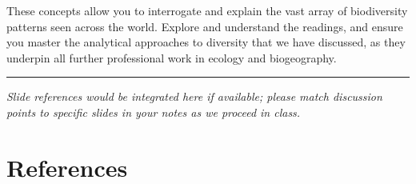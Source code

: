 \documentclass[
  12pt,
]{book}
\begin{document}
These concepts allow you to interrogate and explain the vast array of
biodiversity patterns seen across the world. Explore and understand the
readings, and ensure you master the analytical approaches to diversity
that we have discussed, as they underpin all further professional work
in ecology and biogeography.

\begin{center}\rule{0.5\linewidth}{0.5pt}\end{center}

\emph{Slide references would be integrated here if available; please
match discussion points to specific slides in your notes as we proceed
in class.}

\chapter*{References}\label{references}
\end{document}

